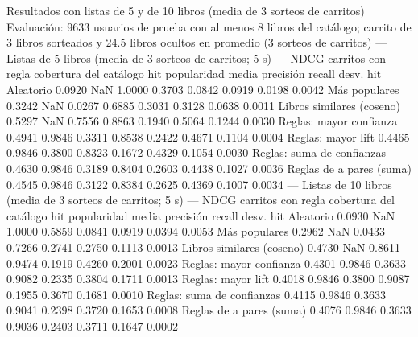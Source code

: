 \documentclass[11pt,letterpaper]{article}
\begin{document}
\begin{consola}[label=out:eval]{Resultados con listas de 5 y de 10 libros (media de 3 sorteos de carritos)}
Evaluación: 9633 usuarios de prueba con al menos 8 libros del catálogo; carrito de 3 libros sorteados y 24.5 libros ocultos en promedio (3 sorteos de carritos)
--- Listas de 5 libros (media de 3 sorteos de carritos; 5 s) ---
                              NDCG  carritos con regla  cobertura del catálogo     hit  popularidad media  precisión  recall  desv. hit
Aleatorio                   0.0920                 NaN                  1.0000  0.3703             0.0842     0.0919  0.0198     0.0042
Más populares               0.3242                 NaN                  0.0267  0.6885             0.3031     0.3128  0.0638     0.0011
Libros similares (coseno)   0.5297                 NaN                  0.7556  0.8863             0.1940     0.5064  0.1244     0.0030
Reglas: mayor confianza     0.4941              0.9846                  0.3311  0.8538             0.2422     0.4671  0.1104     0.0004
Reglas: mayor lift          0.4465              0.9846                  0.3800  0.8323             0.1672     0.4329  0.1054     0.0030
Reglas: suma de confianzas  0.4630              0.9846                  0.3189  0.8404             0.2603     0.4438  0.1027     0.0036
Reglas de a pares (suma)    0.4545              0.9846                  0.3122  0.8384             0.2625     0.4369  0.1007     0.0034
--- Listas de 10 libros (media de 3 sorteos de carritos; 5 s) ---
                              NDCG  carritos con regla  cobertura del catálogo     hit  popularidad media  precisión  recall  desv. hit
Aleatorio                   0.0930                 NaN                  1.0000  0.5859             0.0841     0.0919  0.0394     0.0053
Más populares               0.2962                 NaN                  0.0433  0.7266             0.2741     0.2750  0.1113     0.0013
Libros similares (coseno)   0.4730                 NaN                  0.8611  0.9474             0.1919     0.4260  0.2001     0.0023
Reglas: mayor confianza     0.4301              0.9846                  0.3633  0.9082             0.2335     0.3804  0.1711     0.0013
Reglas: mayor lift          0.4018              0.9846                  0.3800  0.9087             0.1955     0.3670  0.1681     0.0010
Reglas: suma de confianzas  0.4115              0.9846                  0.3633  0.9041             0.2398     0.3720  0.1653     0.0008
Reglas de a pares (suma)    0.4076              0.9846                  0.3633  0.9036             0.2403     0.3711  0.1647     0.0002
\end{consola}
\end{document}

